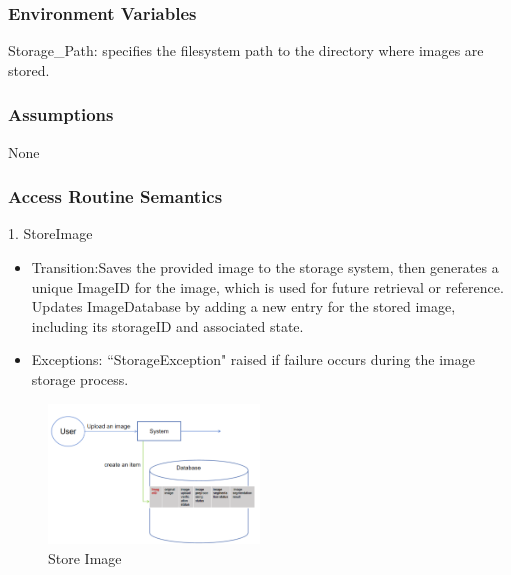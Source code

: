 \documentclass[12pt, titlepage]{article}
\begin{document}
\subsubsection{Environment Variables}

Storage\_Path: specifies the filesystem path to the directory where images are stored.

\subsubsection{Assumptions}

None 

\subsubsection{Access Routine Semantics}
1. StoreImage
\begin{itemize}
    \item Transition:Saves the provided image to the storage system, then generates a unique ImageID for the image, which is used for future retrieval or reference. Updates ImageDatabase by adding a new entry for the stored image, including its storageID and associated state.
    \item Exceptions: ``StorageException" raised if failure occurs during the image storage process.
\end{itemize}
\begin{figure}[H]
\centering
\includegraphics[width=0.5\textwidth]{2.png}
\caption{Store Image}
\label{Fig1}
\end{figure}
\end{document}
